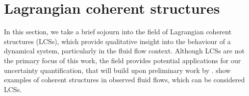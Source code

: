 

\section{Lagrangian coherent structures}\label{sec:bkg_lcs}
In this section, we take a brief sojourn into the field of Lagrangian coherent structures (LCSs), which provide qualitative insight into the behaviour of a dynamical system, particularly in the fluid flow context.
Although LCSs are not the primary focus of this work, the field provides potential applications for our uncertainty quantification, that will build upon preliminary work by \citet{Balasuriya_2020_StochasticSensitivityComputable,Balasuriya_2020_UncertaintyFinitetimeLyapunov,BadzaEtAl_2023_HowSensitiveAre}.
 show examples of coherent structures in observed fluid flows, which can be considered LCSs.

